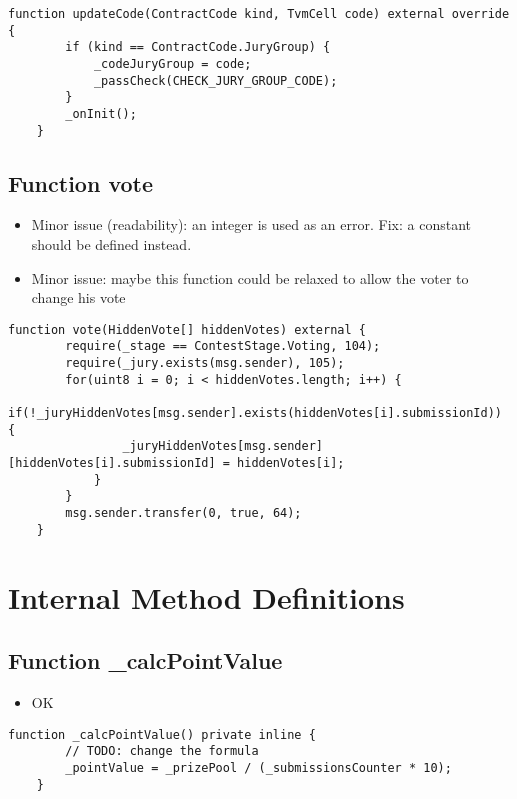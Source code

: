 \begin{lstlisting}[firstnumber=73]
    function updateCode(ContractCode kind, TvmCell code) external override {
        if (kind == ContractCode.JuryGroup) {
            _codeJuryGroup = code;
            _passCheck(CHECK_JURY_GROUP_CODE);
        }
        _onInit();
    }
\end{lstlisting}

\subsection{Function vote}

\begin{itemize}
\item Minor issue (readability): an integer is used as an error. Fix:
  a constant should be defined instead.
\item Minor issue: maybe this function could be relaxed to allow the
  voter to change his vote
\end{itemize}

\begin{lstlisting}[firstnumber=134]
    function vote(HiddenVote[] hiddenVotes) external {
        require(_stage == ContestStage.Voting, 104);
        require(_jury.exists(msg.sender), 105);
        for(uint8 i = 0; i < hiddenVotes.length; i++) {
            if(!_juryHiddenVotes[msg.sender].exists(hiddenVotes[i].submissionId)) {
                _juryHiddenVotes[msg.sender][hiddenVotes[i].submissionId] = hiddenVotes[i];
            }
        }
        msg.sender.transfer(0, true, 64);
    }
\end{lstlisting}

\section{Internal Method Definitions}


\subsection{Function \_{}calcPointValue}

\begin{itemize}
\item OK
\end{itemize}

\begin{lstlisting}[firstnumber=188]
    function _calcPointValue() private inline {
        // TODO: change the formula
        _pointValue = _prizePool / (_submissionsCounter * 10);
    }
\end{lstlisting}

